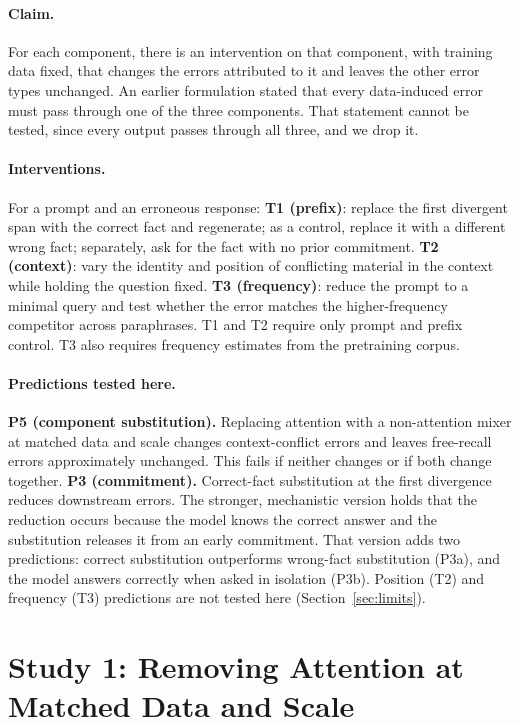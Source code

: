 \documentclass[10pt]{article}
\begin{document}
\paragraph{Claim.} For each component, there is an intervention on that component, with training data fixed, that changes the errors attributed to it and leaves the other error types unchanged. An earlier formulation stated that every data-induced error must pass through one of the three components. That statement cannot be tested, since every output passes through all three, and we drop it.

\paragraph{Interventions.} For a prompt and an erroneous response:
\textbf{T1 (prefix)}: replace the first divergent span with the correct fact and regenerate; as a control, replace it with a different wrong fact; separately, ask for the fact with no prior commitment.
\textbf{T2 (context)}: vary the identity and position of conflicting material in the context while holding the question fixed.
\textbf{T3 (frequency)}: reduce the prompt to a minimal query and test whether the error matches the higher-frequency competitor across paraphrases.
T1 and T2 require only prompt and prefix control. T3 also requires frequency estimates from the pretraining corpus.

\paragraph{Predictions tested here.}
\textbf{P5 (component substitution).} Replacing attention with a non-attention mixer at matched data and scale changes context-conflict errors and leaves free-recall errors approximately unchanged. This fails if neither changes or if both change together.
\textbf{P3 (commitment).} Correct-fact substitution at the first divergence reduces downstream errors. The stronger, mechanistic version holds that the reduction occurs because the model knows the correct answer and the substitution releases it from an early commitment. That version adds two predictions: correct substitution outperforms wrong-fact substitution (P3a), and the model answers correctly when asked in isolation (P3b).
Position (T2) and frequency (T3) predictions are not tested here (Section~\ref{sec:limits}).

\section{Study 1: Removing Attention at Matched Data and Scale}
\label{sec:study1}
\end{document}
